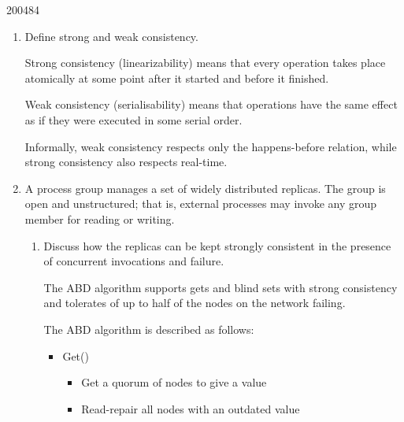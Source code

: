 \documentclass[10pt,\jkfside,a4paper]{article}
\begin{document}
\begin{examquestion}{2004}{8}{4}

\begin{enumerate}[label=(\alph*)]

\item Define strong and weak consistency.

Strong consistency (linearizability) means that every operation takes place
atomically at some point after it started and before it finished.

Weak consistency (serialisability) means that operations have the same
effect as if they were executed in some serial order.

Informally, weak consistency respects only the happens-before relation,
while strong consistency also respects real-time.

\item A process group manages a set of widely distributed replicas. The
group is open and unstructured; that is, external processes may invoke any
group member for reading or writing.

\begin{enumerate}[label=(\roman*)]

\item Discuss how the replicas can be kept strongly consistent in the
presence of concurrent invocations and failure.

The ABD algorithm supports gets and blind sets with strong consistency and
tolerates of up to half of the nodes on the network failing.

The ABD algorithm is described as follows:

\begin{itemize}

\item Get()

\begin{itemize}

\item Get a quorum of nodes to give a value

\item Read-repair all nodes with an outdated value


\end{itemize}
\end{itemize}
\end{enumerate}
\end{enumerate}
\end{examquestion}
\end{document}
